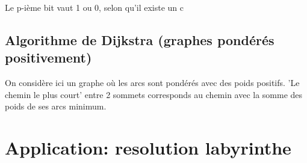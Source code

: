 \documentclass[a4paper,10pt]{article}
\begin{document}
	
    Le p-ième bit vaut 1 ou 0, selon qu'il existe un c

  \subsection{Algorithme de Dijkstra (graphes pondérés positivement)}
    On considère ici un graphe où les arcs sont pondérés avec des poids positifs.\newline
    'Le chemin le plus court' entre 2 sommets corresponds au chemin avec la somme des poids de ses arcs minimum.\newline

  \newpage
  \section{Application: resolution labyrinthe}
\end{document}
